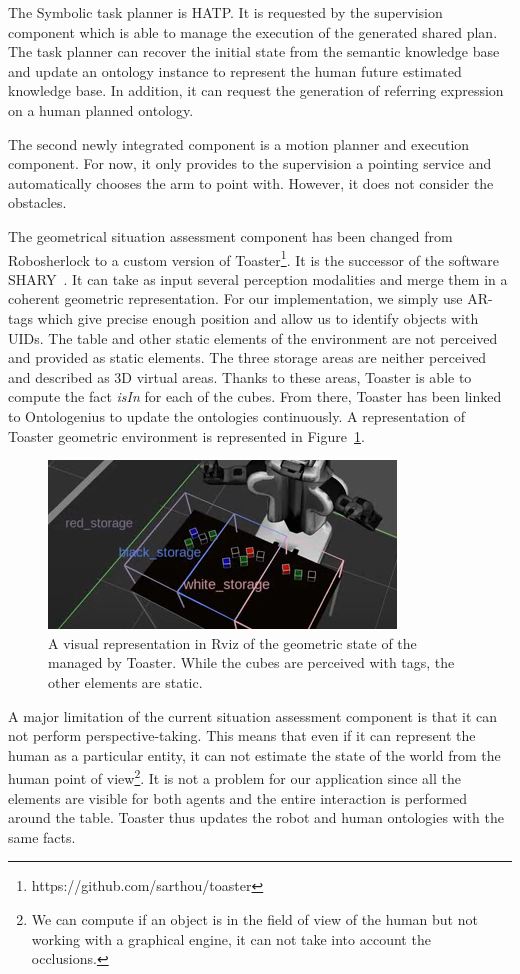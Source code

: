 The Symbolic task planner is HATP. It is requested by the supervision component which is able to manage the execution of the generated shared plan. The task planner can recover the initial state from the semantic knowledge base and update an ontology instance to represent the human future estimated knowledge base. In addition, it can request the generation of referring expression on a human planned ontology.

The second newly integrated component is a motion planner and execution component. For now, it only provides to the supervision a pointing service and automatically chooses the arm to point with. However, it does not consider the obstacles.

The geometrical situation assessment component has been changed from Robosherlock to a custom version of Toaster\footnote{https://github.com/sarthou/toaster}. It is the successor of the software SHARY~\cite{milliez_2014_framework}. It can take as input several perception modalities and merge them in a coherent geometric representation. For our implementation, we simply use AR-tags which give precise enough position and allow us to identify objects with UIDs. The table and other static elements of the environment are not perceived and provided as static elements. The three storage areas are neither perceived and described as 3D virtual areas. Thanks to these areas, Toaster is able to compute the fact \textit{isIn} for each of the cubes. From there, Toaster has been linked to Ontologenius to update the ontologies continuously. A representation of Toaster geometric environment is represented in Figure~\ref{fig:chap5_toaster}.

\begin{figure}[!ht]
\centering
\includegraphics[scale=0.70]{figures/chapter5/toaster.png}
\caption{\label{fig:chap5_toaster} A visual representation in Rviz of the geometric state of the managed by Toaster. While the cubes are perceived with tags, the other elements are static.
 }
\end{figure}

A major limitation of the current situation assessment component is that it can not perform perspective-taking. This means that even if it can represent the human as a particular entity, it can not estimate the state of the world from the human point of view\footnote{We can compute if an object is in the field of view of the human but not working with a graphical engine, it can not take into account the occlusions.}. It is not a problem for our application since all the elements are visible for both agents and the entire interaction is performed around the table. Toaster thus updates the robot and human ontologies with the same facts.
